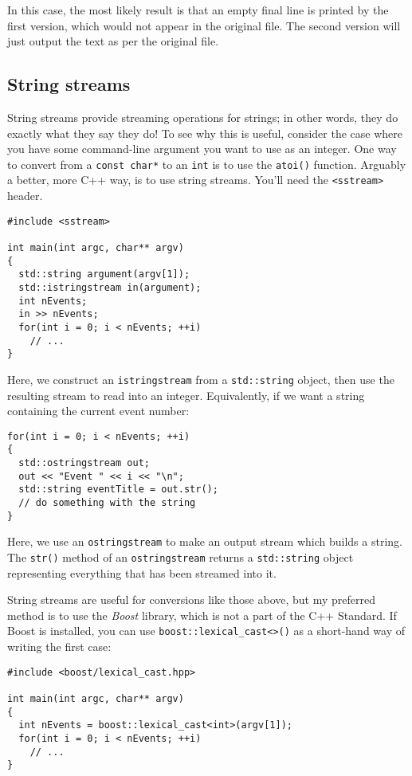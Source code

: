 \documentclass[a4paper]{scrartcl}
\begin{document}
In this case, the most likely result is that an empty final line is printed by the first version, which would not appear in the original file. The second version will just output the text as per the original file.

\subsection{String streams}
String streams provide streaming operations for strings; in other words, they do exactly what they say they do! To see why this is useful, consider the case where you have some command-line argument you want to use as an integer. One way to convert from a \verb|const char*| to an \verb|int| is to use the \verb|atoi()| function. Arguably a better, more C++ way, is to use string streams. You'll need the \verb|<sstream>| header.
\begin{verbatim}
#include <sstream>

int main(int argc, char** argv)
{
  std::string argument(argv[1]);
  std::istringstream in(argument);
  int nEvents;
  in >> nEvents;
  for(int i = 0; i < nEvents; ++i)
    // ...
}
\end{verbatim}

Here, we construct an \verb|istringstream| from a \verb|std::string| object, then use the resulting stream to read into an integer. Equivalently, if we want a string containing the current event number:

\begin{verbatim}
for(int i = 0; i < nEvents; ++i)
{
  std::ostringstream out;
  out << "Event " << i << "\n";
  std::string eventTitle = out.str();
  // do something with the string
}
\end{verbatim}

Here, we use an \verb|ostringstream| to make an output stream which builds a string. The \verb|str()| method of an \verb|ostringstream| returns a \verb|std::string| object representing everything that has been streamed into it.

String streams are useful for conversions like those above, but my preferred method is to use the \emph{Boost} library, which is not a part of the C++ Standard. If Boost is installed, you can use \verb|boost::lexical_cast<>()| as a short-hand way of writing the first case:
\begin{verbatim}
#include <boost/lexical_cast.hpp>

int main(int argc, char** argv)
{
  int nEvents = boost::lexical_cast<int>(argv[1]);
  for(int i = 0; i < nEvents; ++i)
    // ...
}
\end{verbatim}
\end{document}
